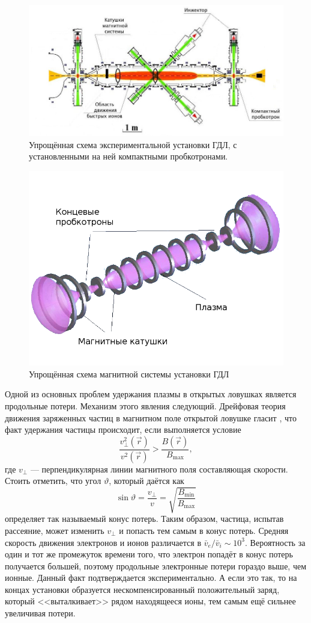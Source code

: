 \begin{figure}[h!]
	\centering
	\includegraphics[width=0.9\linewidth]{../fig/ch5/GDL2012}
	\caption{Упрощённая схема экспериментальной установки ГДЛ, с установленными на ней компактными пробкотронами.}
	\label{fig:GDL2012}
\end{figure}
\begin{figure}[h!]
	\centering
	\includegraphics[width=0.6\linewidth]{../fig/ch5/beutyB}
	\caption{Упрощённая схема магнитной системы установки ГДЛ}
	\label{fig:beutyB}
\end{figure}

Одной из основных проблем удержания плазмы в открытых ловушках является продольные потери. Механизм этого явления следующий. Дрейфовая теория движения заряженных частиц в магнитном поле открытой ловушке гласит \cite{kotelnikov}, что факт удержания частицы происходит, если выполняется условие
\begin{equation}
	\frac{v_{\perp}^2(\vec{r})}{v^2(\vec{r})} > \frac{B(\vec{r})}{B_{\max}},
\end{equation}
где $v_{\perp}$ --- перпендикулярная линии магнитного поля составляющая скорости. 
Стоить отметить, что угол $\vartheta$, который даётся как
\begin{equation}
	\sin \vartheta = \frac{v_{\perp}}{v} = \sqrt{\frac{B_{\min}}{B_{\max}}}
\end{equation}
определяет так называемый конус потерь. 
Таким образом, частица, испытав рассеяние, может изменить $v_{\perp}$ и попасть тем самым в конус потерь. Средняя скорость движения электронов и ионов различается в $\bar{v}_e/\bar{v}_i \sim 10^3$. Вероятность за один и тот же промежуток времени того, что электрон попадёт в конус потерь получается большей, поэтому продольные электронные потери гораздо выше, чем ионные. Данный факт подтверждается экспериментально. А если это так, то на концах установки образуется нескомпенсированный положительный заряд, который <<выталкивает>> рядом находящееся ионы, тем самым ещё сильнее увеличивая потери.

